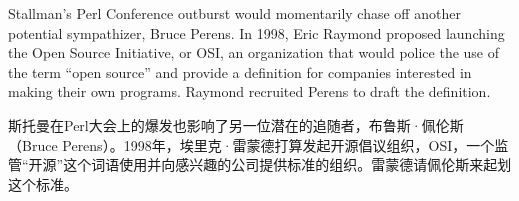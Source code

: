 \ifdefined\eng
Stallman's Perl Conference outburst would momentarily chase off another potential sympathizer, Bruce Perens. In 1998, Eric Raymond proposed launching the Open Source Initiative, or OSI, an organization that would police the use of the term ``open source'' and provide a definition for companies interested in making their own programs. Raymond recruited Perens to draft the definition.
\fi

\ifdefined\chs
斯托曼在Perl大会上的爆发也影响了另一位潜在的追随者，布鲁斯·佩伦斯（Bruce Perens）。1998年，埃里克·雷蒙德打算发起开源倡议组织，OSI，一个监管``开源''这个词语使用并向感兴趣的公司提供标准的组织。雷蒙德请佩伦斯来起划这个标准。
\fi






